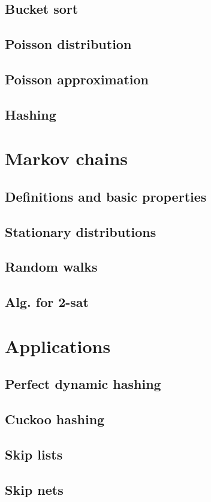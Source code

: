 \documentclass{book}
\begin{document}
\section{Bucket sort}
\section{Poisson distribution} 
\section{Poisson approximation}
\section{Hashing}

\chapter{Markov chains}
\section{Definitions and basic properties}
\section{Stationary distributions}
\section{Random walks}
\section{Alg. for 2-sat}

\chapter{Applications}
\section{Perfect dynamic hashing}
\section{Cuckoo hashing}
\section{Skip lists}
\section{Skip nets}
\end{document}
